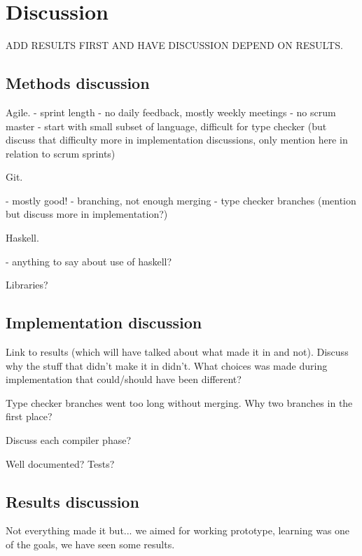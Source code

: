 \chapter{Discussion}



ADD RESULTS FIRST AND HAVE DISCUSSION DEPEND ON RESULTS.

\section{Methods discussion}

Agile.
- sprint length
- no daily feedback, mostly weekly meetings
- no scrum master
- start with small subset of language, difficult for type checker (but discuss that difficulty more in implementation discussions, only mention here in relation to scrum sprints)


Git.

- mostly good! 
- branching, not enough merging
- type checker branches (mention but discuss more in implementation?)

Haskell.

- anything to say about use of haskell?

Libraries?


\section{Implementation discussion}

Link to results (which will have talked about what made it in and not).
Discuss why the stuff that didn't make it in didn't.
What choices was made during implementation that could/should have been different?

Type checker branches went too long without merging.
Why two branches in the first place?

Discuss each compiler phase?

Well documented? Tests?




\section{Results discussion}

Not everything made it but...
we aimed for working prototype,
learning was one of the goals,
we have seen some results.


